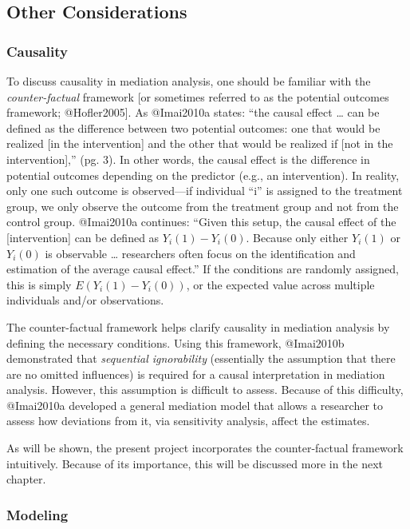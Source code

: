 \documentclass[]{article}
\begin{document}
\subsection{Other Considerations}\label{other-considerations}

\subsubsection{Causality}\label{causality}

To discuss causality in mediation analysis, one should be familiar with
the \emph{counter-factual} framework {[}or sometimes referred to as the
potential outcomes framework; @Hofler2005{]}. As @Imai2010a states:
``the causal effect \ldots{} can be defined as the difference between
two potential outcomes: one that would be realized {[}in the
intervention{]} and the other that would be realized if {[}not in the
intervention{]},'' (pg. 3). In other words, the causal effect is the
difference in potential outcomes depending on the predictor (e.g., an
intervention). In reality, only one such outcome is observed---if
individual ``i'' is assigned to the treatment group, we only observe the
outcome from the treatment group and not from the control group.
@Imai2010a continues: ``Given this setup, the causal effect of the
{[}intervention{]} can be defined as \(Y_i(1) - Y_i(0)\). Because only
either \(Y_i(1)\) or \(Y_i(0)\) is observable \ldots{} researchers often
focus on the identification and estimation of the average causal
effect.'' If the conditions are randomly assigned, this is simply
\(E(Y_i(1) - Y_i(0))\), or the expected value across multiple
individuals and/or observations.

The counter-factual framework helps clarify causality in mediation
analysis by defining the necessary conditions. Using this framework,
@Imai2010b demonstrated that \emph{sequential ignorability} (essentially
the assumption that there are no omitted influences) is required for a
causal interpretation in mediation analysis. However, this assumption is
difficult to assess. Because of this difficulty, @Imai2010a developed a
general mediation model that allows a researcher to assess how
deviations from it, via sensitivity analysis, affect the estimates.

As will be shown, the present project incorporates the counter-factual
framework intuitively. Because of its importance, this will be discussed
more in the next chapter.

\subsubsection{Modeling}\label{modeling}
\end{document}
